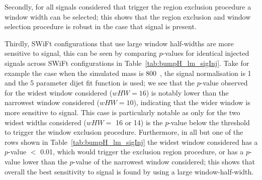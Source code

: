 Secondly, for all signals considered that trigger the region exclusion procedure a window width can be selected;
this shows that the region exclusion and window selection procedure is robust in the case that signal is present.

Thirdly, SWiFt configurations that use large window half-widths are more sensitive to signal,
this can be seen by comparing \bh{} $p$-values for identical injected signals across SWiFt configurations in Table~\ref{tab:bumpH_lm_sigInj}.
Take for example the case when the simulated mass is 800~\GeV{},
the signal normalisation is 1 and the 5 parameter dijet fit function is used;
we see that the $p$-value observed for the widest window considered ($wHW = 16$)
is notably lower than the narrowest window considered ($wHW = 10$),
indicating that the wider window is more sensitive to signal.
This case is particularly notable as only for the two widest widths considered
($wHW =$ 16 or 14) is the $p$-value
below the threshold to trigger the window exclusion procedure.
Furthermore, in all but one of the rows shown in Table~\ref{tab:bumpH_lm_sigInj}
the widest window considered has a $p$-value $<$ 0.01, which would trigger the exclusion region procedure,
or has a $p$-value lower than the $p$-value of the narrowest window considered;
this shows that overall the best sensitivity to signal is found by using a large window-half-width. 

